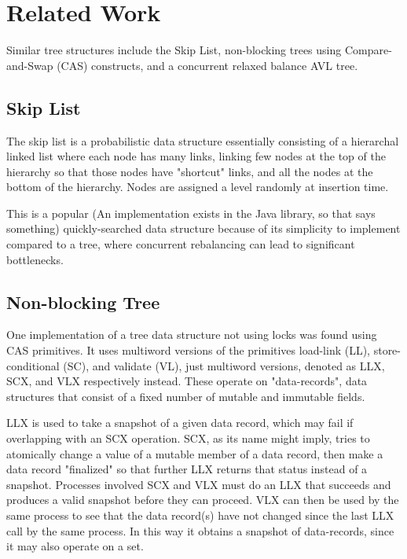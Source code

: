 \documentclass[finalreport,12pt]{elsarticle}
\begin{document}
\fi



\section{Related Work}
\label{S:2}

Similar tree structures include the Skip List\cite{Wicht}, non-blocking trees using Compare-and-Swap (CAS) constructs\cite{Brown}, and a concurrent relaxed balance AVL tree\cite{Bronson}.

\subsection{Skip List}
The skip list is a probabilistic data structure essentially consisting of a hierarchal linked list where each node has many links, linking few nodes at the top of the hierarchy so that those nodes have "shortcut" links, and all the nodes at the bottom of the hierarchy. Nodes are assigned a level randomly at insertion time\cite{Wicht}. 

This is a popular (An implementation exists in the Java library, so that says something) quickly-searched data structure because of its simplicity to implement compared to a tree, where concurrent rebalancing can lead to significant bottlenecks\cite{Wicht}.

\subsection{Non-blocking Tree}

One implementation of a tree data structure not using locks was found using CAS primitives. It uses multiword versions of the primitives load-link (LL), store-conditional (SC), and validate (VL), just multiword versions, denoted as LLX, SCX, and VLX respectively instead. These operate on "data-records", data structures that consist of a fixed number of mutable and immutable fields. 

LLX is used to take a snapshot of a given data record, which may fail if overlapping with an SCX operation. SCX, as its name might imply, tries to atomically change a value of a mutable member of a data record, then make a data record "finalized" so that further LLX returns that status instead of a snapshot. Processes involved SCX and VLX must do an LLX that succeeds and produces a valid snapshot before they can proceed. VLX can then be used by the same process to see that the data record(s) have not changed since the last LLX call by the same process. In this way it obtains a snapshot of data-records, since it may also operate on a set. 
\end{document}

